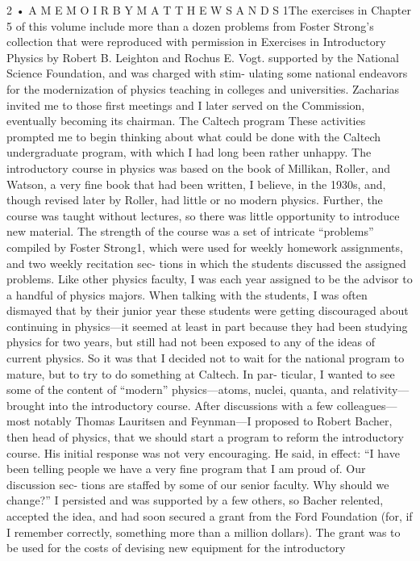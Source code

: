 \documentclass[10pt,oneside]{article}
\begin{document}
2 • A  M E M O I R  B Y  M A T T H E W  S A N D S 1The exercises in Chapter 5 of this volume include more than a dozen problems from Foster Strong’s collection that were reproduced with permission in Exercises in Introductory Physics by Robert B. Leighton and Rochus E. Vogt. supported by the National Science Foundation, and was charged with stim- ulating some national endeavors for the modernization of physics teaching in colleges and universities. Zacharias invited me to those first meetings and I later served on the Commission, eventually becoming its chairman. The Caltech program These activities prompted me to begin thinking about what could be done with the Caltech undergraduate program, with which I had long been rather unhappy. The introductory course in physics was based on the book of Millikan, Roller, and Watson, a very fine book that had been written, I believe, in the 1930s, and, though revised later by Roller, had little or no modern physics. Further, the course was taught without lectures, so there was little opportunity to introduce new material. The strength of the course was a set of intricate “problems” compiled by Foster Strong1, which were used for weekly homework assignments, and two weekly recitation sec- tions in which the students discussed the assigned problems. Like other physics faculty, I was each year assigned to be the advisor to a handful of physics majors. When talking with the students, I was often dismayed that by their junior year these students were getting discouraged about continuing in physics---it seemed at least in part because they had been studying physics for two years, but still had not been exposed to any of the ideas of current physics. So it was that I decided not to wait for the national program to mature, but to try to do something at Caltech. In par- ticular, I wanted to see some of the content of “modern” physics---atoms, nuclei, quanta, and relativity---brought into the introductory course. After discussions with a few colleagues---most notably Thomas Lauritsen and Feynman---I proposed to Robert Bacher, then head of physics, that we should start a program to reform the introductory course. His initial response was not very encouraging. He said, in effect: “I have been telling people we have a very fine program that I am proud of. Our discussion sec- tions are staffed by some of our senior faculty. Why should we change?” I persisted and was supported by a few others, so Bacher relented, accepted the idea, and had soon secured a grant from the Ford Foundation (for, if I remember correctly, something more than a million dollars). The grant was to be used for the costs of devising new equipment for the introductory\par
\end{document}
